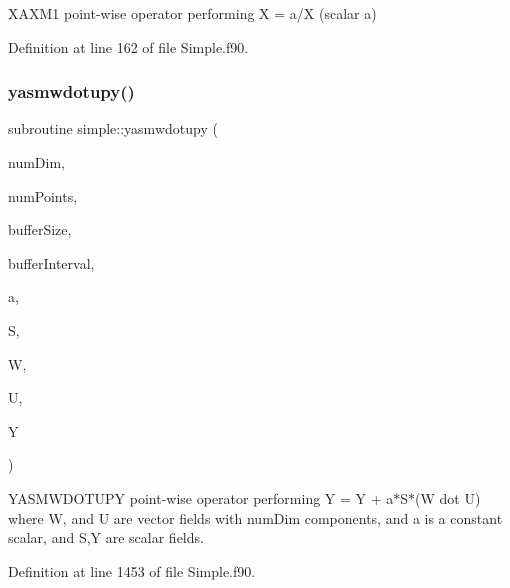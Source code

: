 X\+A\+X\+M1 point-\/wise operator performing X = a/X (scalar a) 



Definition at line 162 of file Simple.\+f90.

\hypertarget{namespacesimple_a8f61bdc8c6ab35cdd9d71616200fd9f4}{}\label{namespacesimple_a8f61bdc8c6ab35cdd9d71616200fd9f4} 
\subsubsection{\texorpdfstring{yasmwdotupy()}{yasmwdotupy()}}
{\footnotesize\ttfamily subroutine simple\+::yasmwdotupy (\begin{DoxyParamCaption}\item[{integer(kind=4), intent(in)}]{num\+Dim,  }\item[{integer(kind=8), intent(in)}]{num\+Points,  }\item[{integer(kind=8), dimension(numdim), intent(in)}]{buffer\+Size,  }\item[{integer(kind=8), dimension(2$\ast$numdim), intent(in)}]{buffer\+Interval,  }\item[{real(kind=8), intent(in)}]{a,  }\item[{real(kind=8), dimension(numpoints), intent(in)}]{S,  }\item[{real(kind=8), dimension(numdim$\ast$numpoints), intent(in)}]{W,  }\item[{real(kind=8), dimension(numdim$\ast$numpoints), intent(in)}]{U,  }\item[{real(kind=8), dimension(numpoints), intent(inout)}]{Y }\end{DoxyParamCaption})}



Y\+A\+S\+M\+W\+D\+O\+T\+U\+PY point-\/wise operator performing Y = Y + a$\ast$\+S$\ast$(W dot U) where W, and U are vector fields with num\+Dim components, and a is a constant scalar, and S,Y are scalar fields. 



Definition at line 1453 of file Simple.\+f90.

\hypertarget{namespacesimple_a09474af35d990198966e2950a33ba9d5}{}\label{namespacesimple_a09474af35d990198966e2950a33ba9d5} 
